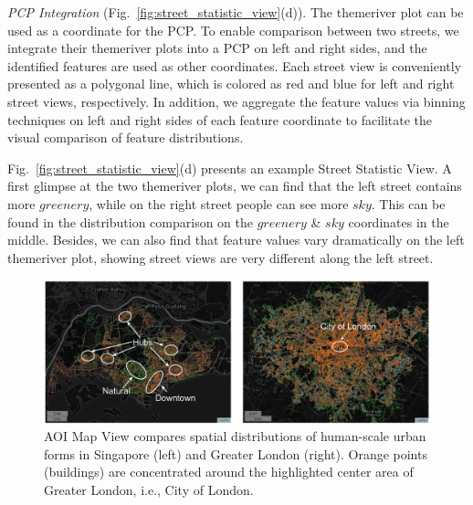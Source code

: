 \vspace*{1mm}
\noindent
\textit{PCP Integration} (Fig.~\ref{fig:street_statistic_view}(d)).
The themeriver plot can be used as a coordinate for the PCP.
To enable comparison between two streets, we integrate their themeriver plots into a PCP on left and right sides, and the identified features are used as other coordinates.
Each street view is conveniently presented as a polygonal line, which is colored as red and blue for left and right street views, respectively.
In addition, we aggregate the feature values via binning techniques on left and right sides of each feature coordinate to facilitate the visual comparison of feature distributions.

\vspace*{1mm}
Fig.~\ref{fig:street_statistic_view}(d) presents an example Street Statistic View. 
A first glimpse at the two themeriver plots, we can find that the left street contains more $greenery$, while on the right street people can see more $sky$.
This can be found in the distribution comparison on the $greenery$ \& $sky$ coordinates in the middle.
Besides, we can also find that feature values vary dramatically on the left themeriver plot, showing street views are very different along the left street.


\begin{figure}[t]
	\centering
	\includegraphics[width=0.95\columnwidth]{figure/streetvizor/fig8_study_1/study_1_spatial}
	\vspace{-4mm}
	\caption{
	AOI Map View compares spatial distributions of human-scale urban forms in Singapore (left) and Greater London (right).
	Orange points (buildings) are concentrated around the highlighted center area of Greater London, i.e., City of London.}
	\label{fig:study_1_spatial}
\end{figure}

